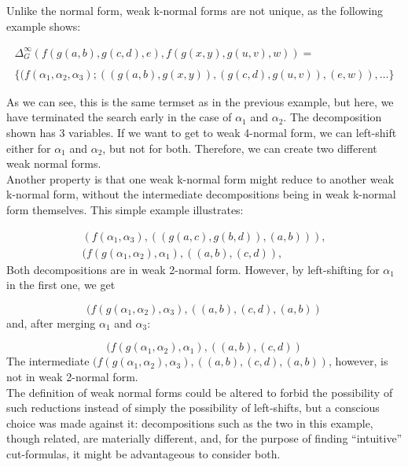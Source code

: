 \documentclass[a4paper, 11pt]{report}
\begin{document}
\medskip

Unlike the normal form, weak k-normal forms are not unique, as the following example shows:

$$
  \begin{array}{l}
    \Delta_G^\infty(f(g(a,b),g(c,d),e), f(g(x,y),g(u,v),w)) =\\
    \\
    \{(f(\alpha_1,\alpha_2,\alpha_3); ((g(a,b),g(x,y)), (g(c,d),g(u,v)), (e,w)),\dots \}
  \end{array}
$$

As we can see, this is the same termset as in the previous example, but here, we have terminated the search early in the case of $\alpha_1$ and $\alpha_2$. The decomposition shown has 3 variables. If we want to get to weak 4-normal form, we can left-shift either for $\alpha_1$ and $\alpha_2$, but not for both. Therefore, we can create two different weak normal forms.\\

Another property is that one weak k-normal form might reduce to another weak k-normal form, without the intermediate decompositions being in weak k-normal form themselves. This simple example illustrates:

$$
  \begin{array}{l}
    (f(\alpha_1,\alpha_3), ((g(a,c),g(b,d)), (a,b))),\\
    (f(g(\alpha_1,\alpha_2),\alpha_1), ((a,b), (c,d)),
  \end{array}
$$
\noindent
Both decompositions are in weak 2-normal form. However, by left-shifting for $\alpha_1$ in the first one, we get

$$
  (f(g(\alpha_1,\alpha_2),\alpha_3), ((a,b), (c,d) , (a,b))
$$
\noindent
and, after merging $\alpha_1$ and $\alpha_3$:

$$
  (f(g(\alpha_1,\alpha_2),\alpha_1), ((a,b), (c,d))
$$
\noindent
The intermediate $(f(g(\alpha_1,\alpha_2),\alpha_3), ((a,b), (c,d) , (a,b))$, however, is not in weak 2-normal form.\\

The definition of weak normal forms could be altered to forbid the possibility of such reductions instead of simply the possibility of left-shifts, but a conscious choice was made against it: decompositions such as the two in this example, though related, are materially different, and, for the purpose of finding ``intuitive'' cut-formulas, it might be advantageous to consider both.



\end{document}
